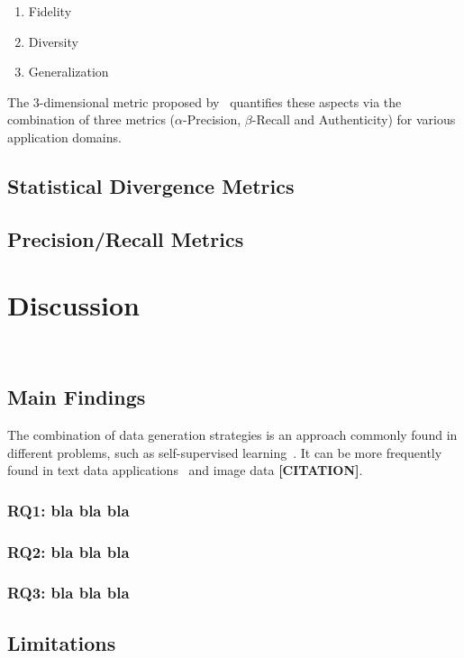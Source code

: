 \documentclass[parskip=full]{scrartcl}
\begin{document}
\begin{enumerate}
    \item Fidelity
    \item Diversity 
    \item Generalization
\end{enumerate}

The 3-dimensional metric proposed by~\citet{alaa2022faithful} quantifies these
aspects via the combination of three metrics ($\alpha$-Precision,
$\beta$-Recall and Authenticity) for various application domains.

\subsection{Statistical Divergence Metrics} 

\subsection{Precision/Recall Metrics}

\section{Discussion}~\label{sec:discussion}

\subsection{Main Findings}

The combination of data generation strategies is an approach commonly found in
different problems, such as self-supervised
learning~\cite{grill2020bootstrap}. It can be more frequently found in text
data applications~\cite{bayer2021survey} and image data \textbf{[CITATION]}.

\subsubsection{RQ1: bla bla bla}

\subsubsection{RQ2: bla bla bla}

\subsubsection{RQ3: bla bla bla}

\subsection{Limitations}
\end{document}
